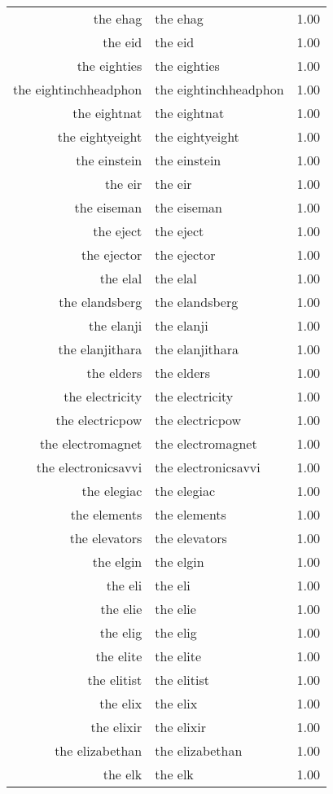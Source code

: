 \begin{table}[ht]
\begin{tabular}{rlr}
  the ehag & the ehag & 1.00 \\ 
  the eid & the eid & 1.00 \\ 
  the eighties & the eighties & 1.00 \\ 
  the eightinchheadphon & the eightinchheadphon & 1.00 \\ 
  the eightnat & the eightnat & 1.00 \\ 
  the eightyeight & the eightyeight & 1.00 \\ 
  the einstein & the einstein & 1.00 \\ 
  the eir & the eir & 1.00 \\ 
  the eiseman & the eiseman & 1.00 \\ 
  the eject & the eject & 1.00 \\ 
  the ejector & the ejector & 1.00 \\ 
  the elal & the elal & 1.00 \\ 
  the elandsberg & the elandsberg & 1.00 \\ 
  the elanji & the elanji & 1.00 \\ 
  the elanjithara & the elanjithara & 1.00 \\ 
  the elders & the elders & 1.00 \\ 
  the electricity & the electricity & 1.00 \\ 
  the electricpow & the electricpow & 1.00 \\ 
  the electromagnet & the electromagnet & 1.00 \\ 
  the electronicsavvi & the electronicsavvi & 1.00 \\ 
  the elegiac & the elegiac & 1.00 \\ 
  the elements & the elements & 1.00 \\ 
  the elevators & the elevators & 1.00 \\ 
  the elgin & the elgin & 1.00 \\ 
  the eli & the eli & 1.00 \\ 
  the elie & the elie & 1.00 \\ 
  the elig & the elig & 1.00 \\ 
  the elite & the elite & 1.00 \\ 
  the elitist & the elitist & 1.00 \\ 
  the elix & the elix & 1.00 \\ 
  the elixir & the elixir & 1.00 \\ 
  the elizabethan & the elizabethan & 1.00 \\ 
  the elk & the elk & 1.00 \\ 

\end{tabular}
\end{table}
